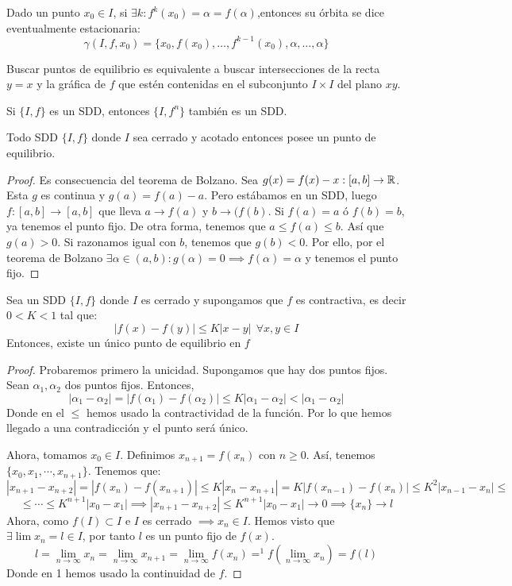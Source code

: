 \begin{ndef}
	Dado un punto $x_0 \in I$, si $\exists k: f^k(x_0) = \alpha = f(\alpha)$,entonces su órbita se dice eventualmente estacionaria:
	\[
	\gamma(I,f,x_0) = \{x_0, f(x_0), \dots, f^{k-1}(x_0), \alpha, \dots, \alpha\}
	\]
\end{ndef}
\begin{nota}
	Buscar puntos de equilibrio es equivalente a buscar intersecciones de la recta $y=x$ y la gráfica de $f$ que estén contenidas en el subconjunto $I\times I$ del plano $xy$.
\end{nota}

\begin{nprop}
	Si $\{I,f\}$ es un SDD, entonces $\{I,f^n\}$ también es un SDD.
\end{nprop}

\begin{nth}
	Todo SDD $\{I,f\}$ donde $I$ sea cerrado y acotado entonces posee un punto de equilibrio.
\end{nth}
\begin{proof}
	Es consecuencia del teorema de Bolzano. Sea $g(x) = f(x)-x :[a,b] \to \mathbb{R}$. Esta $g$ es continua y $g(a) = f(a)-a$. Pero estábamos en un SDD, luego $f:[a,b] \to [a,b]$ que lleva $a \to f(a) $ y $b \to(f(b)$. Si $f(a) = a $ ó $f(b) = b$, ya tenemos el punto fijo. De otra forma, tenemos que  $a \leq f(a) \leq b$.
	Así que $g(a) > 0$. Si razonamos igual con $b$, tenemos que $g(b) < 0$.
	Por ello, por el teorema de Bolzano $\exists \alpha \in (a,b) : g(\alpha) = 0 \implies f(\alpha) = \alpha $ y tenemos el punto fijo.


\end{proof}
\begin{nth}
	Sea un SDD $\{I,f\}$ donde $I$ es cerrado y supongamos que $f$ es contractiva, es decir $0 < K < 1$ tal que:
	\[
	|f(x)-f(y)| \leq K |x-y| \ \ \forall x,y \in I
	\]
Entonces, existe un único punto de equilibrio en $f$
\end{nth}

\begin{proof}
	Probaremos primero la unicidad. Supongamos que hay dos puntos fijos. Sean $\alpha_1, \alpha_2$ dos puntos fijos. Entonces,
	 \[
	|\alpha_1 - \alpha_2| = |f(\alpha_1)- f(\alpha_2)| \leq K |\alpha_1 - \alpha_2| < |\alpha_1 - \alpha_2|
	\]
	Donde en el $\leq$ hemos usado la contractividad de la función. Por lo que hemos llegado a una contradicción y el punto será único.

	Ahora, tomamos $x_0\in I$. Definimos $x _{n+1} = f(x_n) $ con $n\geq 0$. Así, tenemos $\{x_0,x_1,\cdots , x _{n+1}\}$. Tenemos que:
	\[
	|x _{n+1} - x _{n+2}| = |f(x_n) - f(x _{n+1})| \leq K |x_n - x _{n+1}|= K |f(x _{n-1})- f(x_n)| \leq K^2|x _{n-1}-x_n| \leq
	\]
	\[
	\leq \cdots \leq K^{n+1}|x_0 - x_1| \implies |x _{n+1}- x _{n+2}| \leq K^{n+1}|x_0-x_1| \to 0 \implies \{x_n\} \to l
	\]
	Ahora, como $f(I)\subset I$ e $I$ es cerrado $\implies x_n \in I $.
	Hemos visto que $\exists \lim x_n = l \in I$, por tanto $l$ es un punto fijo de $f(x)$.
	\[
	l =  \lim_{n\to \infty}x_n = \lim_{n\to \infty}x_{n+1} = \lim_{n\to \infty}f(x_n) =^1 f(\lim_{n\to \infty}x_n) = f(l)
	\]
	Donde en 1 hemos usado la continuidad de $f$.
\end{proof}

